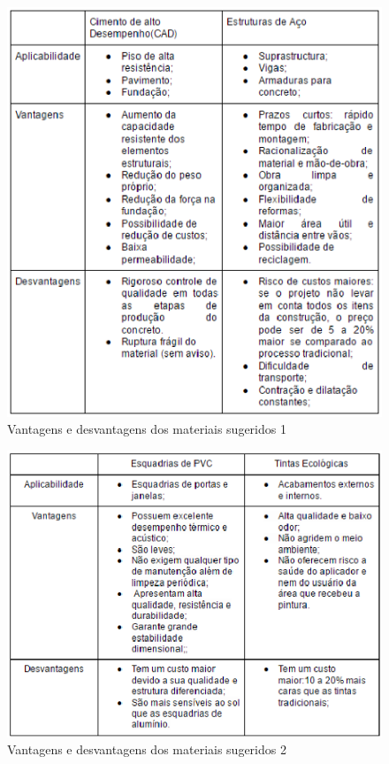 \begin{figure}[!h]
\centering
\includegraphics[keepaspectratio=true,scale=1]{figuras/vantagens_e_desvantagens_material1.eps}
\caption{ Vantagens e desvantagens dos materiais sugeridos 1}
\end{figure}

\begin{figure}[!h]
\centering
\includegraphics[scale=1]{figuras/vantagens_e_desvantagens_do_material_2.eps}
\caption{ Vantagens e desvantagens dos materiais sugeridos 2}
\end{figure}

